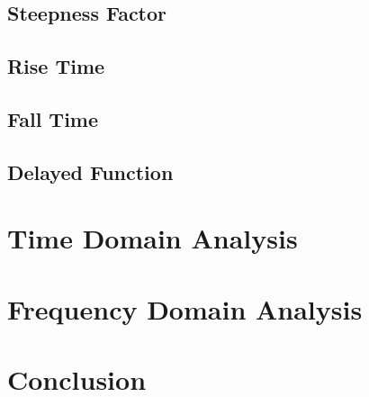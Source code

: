 \subsection{Steepness Factor}
\label{sub:steepness_factor}


\subsection{Rise Time}
\label{sub:rise_time}


\subsection{Fall Time}
\label{sub:fall_time}


\subsection{Delayed Function}
\label{sub:delayed_function}



\section{Time Domain Analysis}
\label{sec:time_domain_analysis}



\section{Frequency Domain Analysis}
\label{sec:frequency_domain_analysis}



\section{Conclusion}
\label{sec:conclusion}
